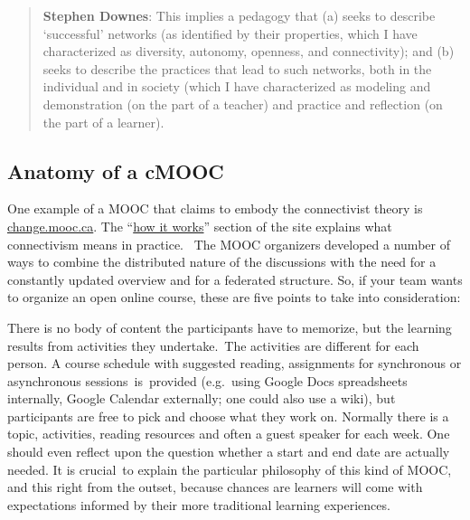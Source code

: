 \begin{quote}
\textbf{Stephen Downes}: This implies a pedagogy that (a) seeks to
describe `successful' networks (as identified by their properties, which
I have characterized as diversity, autonomy, openness, and
connectivity); and (b) seeks to describe the practices that lead to such
networks, both in the individual and in society (which I have
characterized as modeling and demonstration (on the part of a teacher)
and practice and reflection (on the part of a learner).
\end{quote}

\subsection{Anatomy of a cMOOC}\label{anatomy-of-a-cmooc}

One example of a MOOC that claims to embody the connectivist theory is
\href{http://change.mooc.ca/index.html}{change.mooc.ca}. The
``\href{http://change.mooc.ca/how.htm}{how it works}'' section of the
site explains what connectivism means in practice.~ The MOOC organizers
developed a number of ways to combine the distributed nature of the
discussions with the need for a constantly updated overview and for a
federated structure. So, if your team wants to organize an open online
course, these are five points to take into consideration:

There is no body of content the participants have to memorize, but the
learning results from activities they undertake.~The activities are
different for each person. A course schedule with suggested reading,
assignments for synchronous or asynchronous sessions~is~provided
(e.g.~using Google Docs spreadsheets internally, Google Calendar
externally; one could also use a wiki), but participants are free to
pick and choose what they work on. Normally there is a topic,
activities, reading resources and often a guest speaker for each week.
One should even reflect upon the question whether a start and end date
are actually needed. It is crucial~to explain the particular philosophy
of this kind of MOOC, and this right from the outset, because chances
are learners will come with expectations informed by their more
traditional learning experiences.

